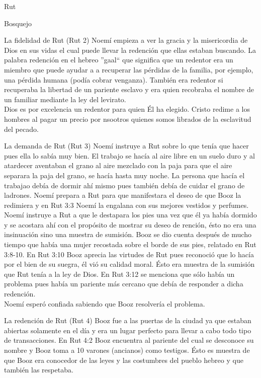 \begin{section}{Rut}
\begin{subsection}{Bosquejo}
\begin{subsubsection}{La fidelidad de Rut (Rut 2)}
				Noemí empieza a ver la gracia y la misericordia de Dios en sus vidas el cual puede llevar la redención que ellas estaban buscando. La palabra redención en el hebreo ''gaal`` que significa que un redentor era un miembro que puede ayudar a a recuperar las pérdidas de la familia, por ejemplo, una pérdida humana (podía cobrar venganza). También era redentor si recuperaba la libertad de un pariente esclavo y era quien recobraba el nombre de un familiar mediante la ley del levirato.\\
				Dios es por excelencia un redentor para quien Él ha elegido. Cristo redime a los hombres al pagar un precio por nsootros quienes somos librados de la esclavitud del pecado. 
		\end{subsubsection}
		\begin{subsubsection}{La demanda de Rut (Rut 3)}
			Noemí instruye a Rut sobre lo que tenía que hacer pues ella lo sabía muy bien. El trabajo se hacía al aire libre en un suelo duro y al atardecer aventaban el grano al aire mezclado con la paja para que el aire separara la paja del grano, se hacía hasta muy noche. La persona que hacía el trabajao debía de dormir ahí mismo pues también debía de cuidar el grano de ladrones. Noemí prepara a Rut para que manifestara el deseo de que Booz la redimiera y en Rut 3:3 Noemí la engalana con sus mejores vestidos y perfumes.
			\newpage
			Noemí instruye a Rut a que le destapara los pies una vez que él ya había dormido y se acostara ahí con el propósito de mostrar su deseo de rención, ésto no era una insinuación sino una muestra de sumisión. Booz se dio cuenta después de mucho tiempo que había una mujer recostada sobre el borde de sus pies, relatado en Rut 3:8-10. En Rut 3:10 Booz aprecia las virtudes de Rut pues reconoció que lo hacía por el bien de su suegra, él vió su calidad moral. Ésto era muestra de la sumisión que Rut tenía a la ley de Dios. En Rut 3:12 se menciona que sólo había un problema pues había un pariente más cercano que debía de responder a dicha redención. \\
			Noemí esperó confiada sabiendo que Booz resolvería el problema.
		\end{subsubsection}
		\begin{subsubsection}{La redención de Rut (Rut 4)}
			Booz fue a las puertas de la ciudad ya que estaban abiertas solamente en el día y era un lugar perfecto para llevar a cabo todo tipo de transacciones. En Rut 4:2 Booz encuentra al pariente del cual se desconoce su nombre y Booz toma a 10 varones (ancianos) como testigos. Ésto es muestra de que Booz era conocedor de las leyes y las costumbres del pueblo hebreo y que también las respetaba.\\

\end{subsubsection}
\end{subsection}
\end{section}
